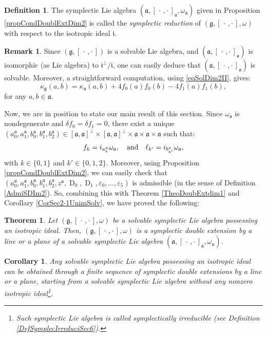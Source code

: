 \documentclass[final,1p,times,nopreprintline]{elsarticle}
\newtheorem{theorem}{Theorem}[section]
\newtheorem{corollary}{Corollary}[section]
\theoremstyle{definition}
\newtheorem{remark}{Remark}[section]
\newtheorem{definition}{Definition}[section]
\numberwithin{equation}{section}
\newcommand{\w}{\omega}
\newcommand{\et}{\quad \textnormal{and}\quad}
\newcommand{\g}{\mathfrak{g}}
\newcommand{\ai}{\mathfrak{a}}
\numberwithin{equation}{section}
\newcommand{\ii}{\mathfrak{i}}
\newcommand{\D}{\operatorname{D}}
\newcommand{\cro}{[\,\cdot\,,\cdot\,]}
\begin{document}
\begin{definition}
	The symplectic Lie algebra $(\ai,[\,\cdot\,,\cdot\,]_\ai,\w_\ai)$ given in Proposition \ref{propCondDoublExtDim2} is called the \textit{symplectic reduction} of $(\g,[\,\cdot\,,\cdot\,],\w)$ with respect to the isotropic ideal $\mathfrak{i}$.
\end{definition}

\begin{remark}
Since $(\g,\cro)$ is a solvable Lie algebra, and $(\ai,\cro_\ai)$ is isomorphic (as Lie algebra) to $\ii^\perp/\ii$, one can easily deduce that $(\ai,\cro_\ai)$ is solvable. Moreover, a straightforward computation, using \eqref{eqSolDim2II}, gives:
	\begin{equation*}
	\kappa_\g(a,b)=\kappa_\ai(a,b)+4f_0(a)f_0(b)-4f_1(a)f_1(b),
\end{equation*} 
for any $a,b\in\ai$. 
\end{remark}

Now, we are in position to state our main result of this section. Since $\w_\ai$ is nondegenerate and $\delta f_0=\delta f_1=0$, there exist a unique $(a_0^\ai,a_1^\ai,b_0^\ai,b_1^\ai,b_2^\ai)\in[\ai,\ai]^\perp\times[\ai,\ai]^\perp\times\ai\times\ai\times\ai$ such that:
\begin{equation*}
f_k=i_{a^\ai_k}\w_\ai,\et \ell_{k'}=i_{b^\ai_{k'}}\w_\ai,
\end{equation*}
with $k\in\{0,1\}$ and $k'\in\{0,1,2\}$. Moreover, using Proposition \ref{propCondDoublExtDim2}, we can easily check that $(a^\ai_0,a^\ai_1,b^\ai_0,b^\ai_1,b^\ai_2,z^\ai,\D_0,\D_1,\varepsilon_0,\ldots,\varepsilon_5)$ is admissible (in the sense of Definition \ref{AdmiSDIm2}). So, combining this with Theorem \ref{TheoDoubExtdim1} and Corollary \ref{CorSec2-1UnimSolv}, we have proved the following:

\begin{theorem}\label{TheoDoubExtdim2}
Let $(\g,\cro,\w)$ be a solvable symplectic Lie algebra possessing an isotropic ideal. Then, $(\g,\cro,\w)$ is a symplectic double extension by a line or a plane of a solvable symplectic Lie algebra $(\ai,\cro_\ai,\w_\ai)$.
\end{theorem}

\begin{corollary}\label{CorDoubExtdim2}
Any solvable symplectic Lie algebra possessing an isotropic ideal can be obtained through a finite sequence of symplectic double extensions by a line or a plane, starting from a solvable symplectic Lie algebra without any nonzero isotropic ideal\footnote{Such symplectic Lie algebra is called \textit{symplectically irreducible} (see Definition \ref{DefSymplecIrreduciSec6}).}.
\end{corollary}
\end{document}
